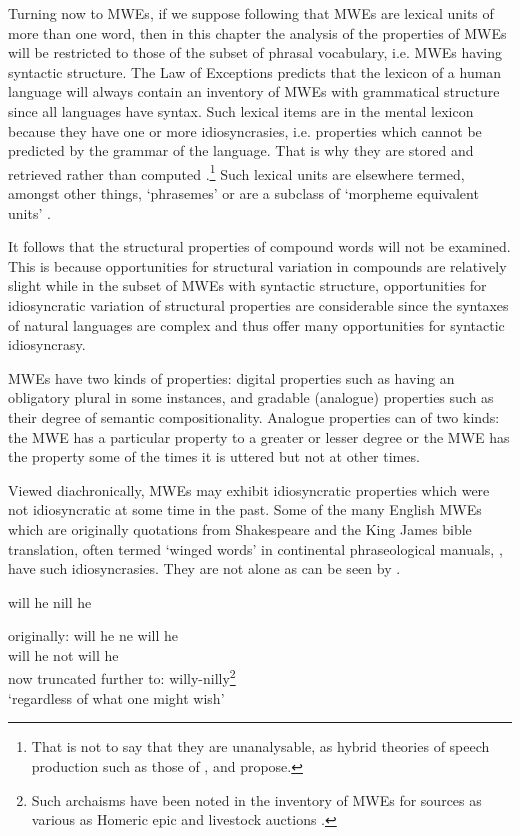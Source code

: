 \documentclass[output=paper]{langsci/langscibook}
\begin{document}
Turning now to MWEs, if we suppose following \citet{Sag:2002} that MWEs are lexical units of more than one word, then in this chapter the analysis of the properties of MWEs will be restricted to those of the subset of phrasal vocabulary, i.e. MWEs having syntactic structure. The Law of Exceptions predicts that the lexicon of a human language will always contain an inventory of MWEs with grammatical structure since all languages have syntax. Such lexical items are in the mental lexicon because they have one or more idiosyncrasies, i.e. properties which cannot be predicted by the grammar of the language. That is why they are stored and retrieved rather than computed \citep{Bresnan1981}.\footnote{   That is not to say that they are unanalysable, as hybrid theories of speech production such as those of \citet{Cutting1997}, \citet{Titone1999} and \citet{Sprenger2006} propose.} Such lexical units are elsewhere termed, amongst other things, ‘phrasemes’ \citep{Melcuk2012} or are a subclass of ‘morpheme equivalent units’ \citep{Wray2008}. 

It follows that the structural properties of compound words will not be examined. This is because opportunities for structural variation in compounds are relatively slight \citep{Selkirk1982} while in the subset of MWEs with syntactic structure, opportunities for idiosyncratic variation of structural properties are considerable since the syntaxes of natural languages are complex and thus offer many opportunities for syntactic idiosyncrasy. 

MWEs have two kinds of properties: %
digital properties such as having an obligatory plural in some 
instances, and gradable (analogue) properties such as their degree 
of semantic compositionality. Analogue properties can of two 
kinds: the MWE has a particular property to a greater or lesser
degree or the MWE has the property some of the times it is uttered 
but not at other times.

Viewed diachronically, MWEs may exhibit idiosyncratic properties which were not idiosyncratic at some time in the past. Some of the many  English MWEs which are originally quotations from Shakespeare and the King James bible translation, often termed ‘winged words’ in continental phraseological manuals, \citep{Glaeser1986}, have such idiosyncrasies. They are not alone as can be seen by .

\begin{exe}
\ex\label{ex:ex01}	will he nill he %
	\begin{xlist} 
    \ex \gll originally: will he  ne  will he\\
	{} will he not will he \\
	\ex now truncated further to: willy-nilly\footnote{   Such archaisms have been noted in the inventory of MWEs for sources as various as Homeric epic \citep{Lord1960} and livestock auctions \citep{Kuiper1984}.}\\
	‘regardless of what one might wish’
    \end{xlist}
\end{exe}
\end{document}
